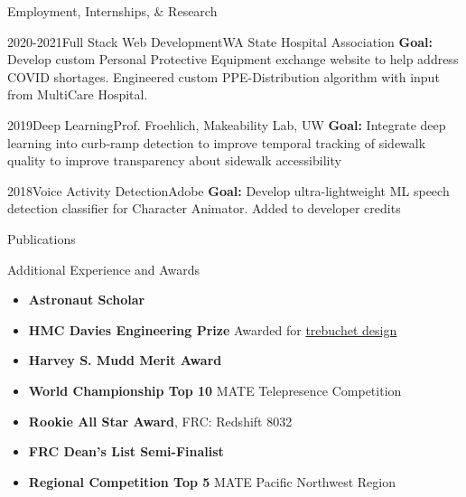 \documentclass[]{mcdowellcv}
\begin{document}
\begin{cvsection}{Employment, Internships, \& Research}
	\begin{cvsubsection}{2020-2021}{Full Stack Web Development}{WA State Hospital Association}
		\textbf{Goal:} Develop custom Personal Protective Equipment exchange website to help address COVID shortages. Engineered custom PPE-Distribution algorithm with input from  MultiCare Hospital.
	\end{cvsubsection}

	\begin{cvsubsection}{2019}{Deep Learning}{Prof. Froehlich, Makeability Lab, UW}
		\textbf{Goal:} Integrate deep learning into curb-ramp detection to improve temporal tracking of sidewalk quality to improve transparency about sidewalk accessibility
	\end{cvsubsection}

	\begin{cvsubsection}{2018}{Voice Activity Detection}{Adobe}
		\textbf{Goal:} Develop ultra-lightweight ML speech detection classifier for Character Animator. Added to developer credits
	\end{cvsubsection}
\end{cvsection}

\begin{cvsection}{Publications}

	

\end{cvsection}

\begin{cvsection}{Additional Experience and Awards}
	\begin{cvsubsection}{}{}{}
		\begin{itemize}
			\item[2024] \textbf{Astronaut Scholar}
			\item[2023] \textbf{HMC Davies Engineering Prize} Awarded for \hyperlink{trebuchet_design}{trebuchet design}
			\item[2022] \textbf{Harvey S. Mudd Merit Award}
			\item[2021] \textbf{World Championship Top 10} MATE  Telepresence Competition
			\item[2020] \textbf{Rookie All Star Award}, FRC: Redshift 8032
			\item[2020] \textbf{FRC Dean's List Semi-Finalist}
			\item[2018] \textbf{Regional Competition Top 5} MATE Pacific Northwest Region
		\end{itemize}
	\end{cvsubsection}
\end{cvsection}
\end{document}
